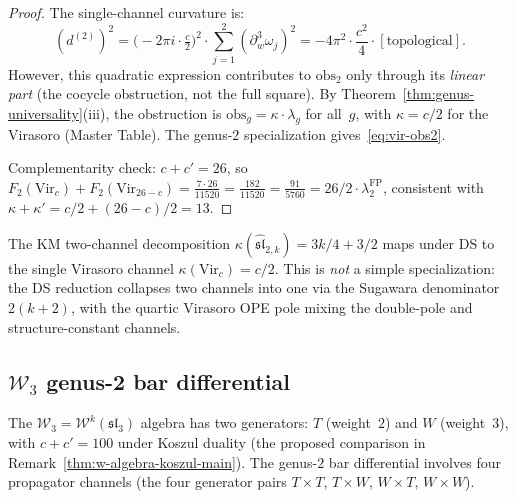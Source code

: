 \begin{proof}
The single-channel curvature is:
\[
(d^{(2)})^2 = \bigl(-2\pi i \cdot \tfrac{c}{2}\bigr)^2
\cdot \sum_{j=1}^{2} (\partial_w^3\omega_j)^2
= -4\pi^2 \cdot \frac{c^2}{4} \cdot [\text{topological}].
\]
However, this quadratic expression contributes to
$\mathrm{obs}_2$ only through its \emph{linear part} (the
cocycle obstruction, not the full square).  By
Theorem~\ref{thm:genus-universality}(iii), the obstruction is
$\mathrm{obs}_g = \kappa \cdot \lambda_g$ for all~$g$, with
$\kappa = c/2$ for the Virasoro (Master Table).  The
genus-$2$ specialization gives~\eqref{eq:vir-obs2}.

Complementarity check: $c + c' = 26$, so
$F_2(\mathrm{Vir}_c) + F_2(\mathrm{Vir}_{26-c})
= \frac{7 \cdot 26}{11520} = \frac{182}{11520}
= \frac{91}{5760} = 26/2 \cdot \lambda_2^{\mathrm{FP}}$,
consistent with
$\kappa + \kappa' = c/2 + (26-c)/2 = 13$.
\end{proof}

\begin{remark}
\label{rem:virasoro-genus2-ds}
The KM two-channel decomposition $\kappa(\widehat{\mathfrak{sl}}_{2,k}) = 3k/4 + 3/2$ maps under DS to the single Virasoro channel $\kappa(\mathrm{Vir}_c) = c/2$.  This is \emph{not} a simple specialization: the DS reduction collapses two channels into one via the Sugawara denominator $2(k+2)$, with the quartic Virasoro OPE pole mixing the double-pole and structure-constant channels.
\end{remark}

\subsection{\texorpdfstring{$\mathcal{W}_3$ genus-2 bar differential}{W3 genus-2 bar differential}}
\label{subsec:w3-genus2-bar}

The $\mathcal{W}_3 = \mathcal{W}^k(\mathfrak{sl}_3)$ algebra has
two generators: $T$ (weight~$2$) and $W$ (weight~$3$), with
$c + c' = 100$ under Koszul duality
(the proposed comparison in Remark~\ref{thm:w-algebra-koszul-main}).  The genus-$2$ bar
differential involves four propagator channels (the four
generator pairs $T \times T$, $T \times W$, $W \times T$,
$W \times W$).

